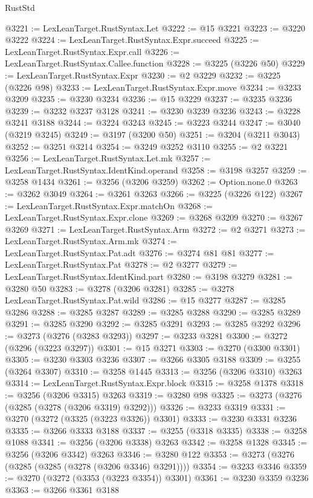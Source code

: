 \begin{lexlean}{RustStd}
\begin{coremodule}
@3221 := LexLeanTarget.RustSyntax.Let
@3222 := @15 @3221
@3223 := @3220 @3222
@3224 := LexLeanTarget.RustSyntax.Expr.succeed
@3225 := LexLeanTarget.RustSyntax.Expr.call
@3226 := LexLeanTarget.RustSyntax.Callee.function
@3228 := @3225 (@3226 @50)
@3229 := LexLeanTarget.RustSyntax.Expr
@3230 := @2 @3229
@3232 := @3225 (@3226 @98)
@3233 := LexLeanTarget.RustSyntax.Expr.move
@3234 := @3233 @3209
@3235 := @3230 @3234
@3236 := @15 @3229
@3237 := @3235 @3236
@3239 := @3232 @3237 @3128
@3241 := @3230 @3239 @3236
@3243 := @3228 @3241 @3188
@3244 := @3224 @3243
@3245 := @3223 @3244
@3247 := @3040 (@3219 @3245)
@3249 := @3197 (@3200 @50)
@3251 := @3204 (@3211 @3043)
@3252 := @3251 @3214
@3254 := @3249 @3252 @3110
@3255 := @2 @3221
@3256 := LexLeanTarget.RustSyntax.Let.mk
@3257 := LexLeanTarget.RustSyntax.IdentKind.operand
@3258 := @3198 @3257
@3259 := @3258 @1434
@3261 := @3256 (@3206 @3259)
@3262 := Option.none.{0}
@3263 := @3262 @3049
@3264 := @3261 @3263
@3266 := @3225 (@3226 @122)
@3267 := LexLeanTarget.RustSyntax.Expr.matchOn
@3268 := LexLeanTarget.RustSyntax.Expr.clone
@3269 := @3268 @3209
@3270 := @3267 @3269
@3271 := LexLeanTarget.RustSyntax.Arm
@3272 := @2 @3271
@3273 := LexLeanTarget.RustSyntax.Arm.mk
@3274 := LexLeanTarget.RustSyntax.Pat.adt
@3276 := @3274 @81 @81
@3277 := LexLeanTarget.RustSyntax.Pat
@3278 := @2 @3277
@3279 := LexLeanTarget.RustSyntax.IdentKind.part
@3280 := @3198 @3279
@3281 := @3280 @50
@3283 := @3278 (@3206 @3281)
@3285 := @3278 LexLeanTarget.RustSyntax.Pat.wild
@3286 := @15 @3277
@3287 := @3285 @3286
@3288 := @3285 @3287
@3289 := @3285 @3288
@3290 := @3285 @3289
@3291 := @3285 @3290
@3292 := @3285 @3291
@3293 := @3285 @3292
@3296 := @3273 (@3276 (@3283 @3293))
@3297 := @3233 @3281
@3300 := @3272 (@3296 (@3223 @3297))
@3301 := @15 @3271
@3303 := @3270 (@3300 @3301)
@3305 := @3230 @3303 @3236
@3307 := @3266 @3305 @3188
@3309 := @3255 (@3264 @3307)
@3310 := @3258 @1445
@3313 := @3256 (@3206 @3310) @3263
@3314 := LexLeanTarget.RustSyntax.Expr.block
@3315 := @3258 @1378
@3318 := @3256 (@3206 @3315) @3263
@3319 := @3280 @98
@3325 := @3273 (@3276 (@3285 (@3278 (@3206 @3319) @3292)))
@3326 := @3233 @3319
@3331 := @3270 (@3272 (@3325 (@3223 @3326)) @3301)
@3333 := @3230 @3331 @3236
@3335 := @3266 @3333 @3188
@3337 := @3255 (@3318 @3335)
@3338 := @3258 @1088
@3341 := @3256 (@3206 @3338) @3263
@3342 := @3258 @1328
@3345 := @3256 (@3206 @3342) @3263
@3346 := @3280 @122
@3353 := @3273 (@3276 (@3285 (@3285 (@3278 (@3206 @3346) @3291))))
@3354 := @3233 @3346
@3359 := @3270 (@3272 (@3353 (@3223 @3354)) @3301)
@3361 := @3230 @3359 @3236
@3363 := @3266 @3361 @3188

\end{coremodule}
\end{lexlean}
